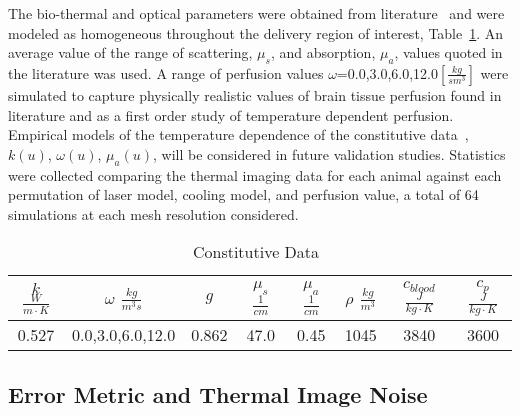 \documentclass{article}
\begin{document}
The bio-thermal and optical parameters were obtained from
literature~\cite{Handbook05,Welch95,duck1990} and were modeled as
homogeneous throughout the delivery region of interest,
Table~\ref{modeldata}.  An average value of the range of
scattering, $\mu_s$, and absorption, $\mu_a$, values quoted in the
literature was used.  A range of perfusion values
$\omega$=0.0,3.0,6.0,12.0$[\frac{kg}{s m^3}]$ were simulated to
capture physically realistic values of brain tissue perfusion found
in literature and as a first order study of temperature dependent
perfusion.  Empirical models of the temperature dependence of the
constitutive data~\cite{pegau1997absorption,Duggan00,Handbook05},
$k(u)$, $\omega(u)$, $\mu_a(u)$, will be considered in future
validation studies.  Statistics were collected comparing the
thermal imaging data for each animal against each permutation of
laser model, cooling model, and perfusion value, a total of 64
simulations at each mesh resolution considered. 

\begin{table}[h]
\caption{Constitutive Data~\cite{Handbook05,Welch95,duck1990}}\label{modeldata}
\centering 
\begin{tabular}{|c|c|c|c|c|c|c|c|} \hline 
$k $ $ \frac{W}{ m \cdot K}$ & $\omega$ $\frac{kg}{m^3 s}$ &  $g$  &  $\mu_s$ $\frac{1}{cm}$  &  $\mu_a$  $\frac{1}{cm}$   &  $\rho$ $\frac{kg}{m^3}$ &   $c_{blood}$ $ \frac{J}{kg \cdot K}$ &  $c_p$ $\frac{J}{kg \cdot K}$ \\ \hline
          0.527              &     0.0,3.0,6.0,12.0        & 0.862 &        47.0              &       0.45                 &  1045                        &            3840                      &                  3600          \\ \hline
\end{tabular}
\end{table}

\subsection{Error Metric and Thermal Image Noise}
\end{document}
